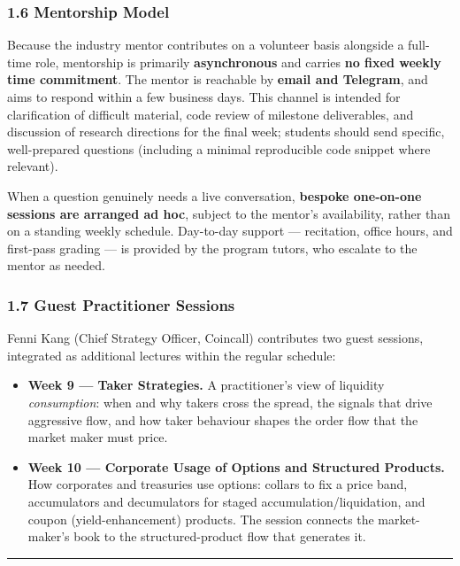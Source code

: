 \documentclass[
]{article}
\providecommand{\tightlist}{%
  \setlength{\itemsep}{0pt}\setlength{\parskip}{0pt}}
\begin{document}
\subsubsection{1.6 Mentorship Model}\label{mentorship-model}

Because the industry mentor contributes on a volunteer basis alongside a
full-time role, mentorship is primarily \textbf{asynchronous} and
carries \textbf{no fixed weekly time commitment}. The mentor is
reachable by \textbf{email and Telegram}, and aims to respond within a
few business days. This channel is intended for clarification of
difficult material, code review of milestone deliverables, and
discussion of research directions for the final week; students should
send specific, well-prepared questions (including a minimal reproducible
code snippet where relevant).

When a question genuinely needs a live conversation, \textbf{bespoke
one-on-one sessions are arranged ad hoc}, subject to the mentor's
availability, rather than on a standing weekly schedule. Day-to-day
support --- recitation, office hours, and first-pass grading --- is
provided by the program tutors, who escalate to the mentor as needed.

\subsubsection{1.7 Guest Practitioner
Sessions}\label{guest-practitioner-sessions}

Fenni Kang (Chief Strategy Officer, Coincall) contributes two guest
sessions, integrated as additional lectures within the regular schedule:

\begin{itemize}
\tightlist
\item
  \textbf{Week 9 --- Taker Strategies.} A practitioner's view of
  liquidity \emph{consumption}: when and why takers cross the spread,
  the signals that drive aggressive flow, and how taker behaviour shapes
  the order flow that the market maker must price.
\item
  \textbf{Week 10 --- Corporate Usage of Options and Structured
  Products.} How corporates and treasuries use options: collars to fix a
  price band, accumulators and decumulators for staged
  accumulation/liquidation, and coupon (yield-enhancement) products. The
  session connects the market-maker's book to the structured-product
  flow that generates it.
\end{itemize}

\begin{center}\rule{0.5\linewidth}{0.5pt}\end{center}
\end{document}

